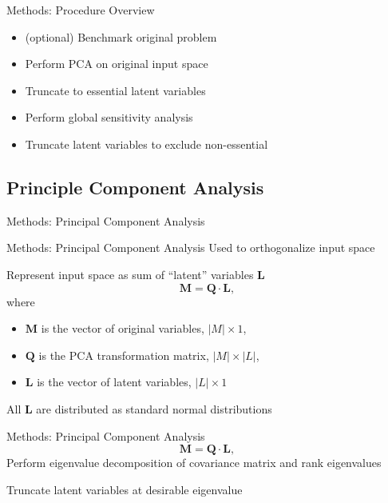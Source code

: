 \documentclass[t,9pt,svgnames]{beamer}
\begin{document}
\begin{frame}{Methods: Procedure Overview}
  \begin{itemize}
    \item (optional) Benchmark original problem
    \item Perform PCA on original input space
    \item Truncate to essential latent variables
    \item Perform global sensitivity analysis
    \item Truncate latent variables to exclude non-essential
  \end{itemize}
\end{frame}

\subsection{Principle Component Analysis}
\begin{frame}{Methods: Principal Component Analysis}
\end{frame}

\begin{frame}{Methods: Principal Component Analysis}
  Used to orthogonalize input space

  Represent input space as sum of ``latent'' variables $\bm{L}$
  \begin{equation}
    \bm{M} = \bm{Q} \cdot \bm{L},
  \end{equation}
  where
  \begin{itemize}
    \item $\bm{M}$ is the vector of original variables, $|M|\times1$,
    \item $\bm{Q}$ is the PCA transformation matrix, $|M|\times |L|$,
    \item $\bm{L}$ is the vector of latent variables, $|L|\times 1$
  \end{itemize}
  All $\bm{L}$ are distributed as standard normal distributions
\end{frame}

\begin{frame}{Methods: Principal Component Analysis}
  \begin{equation}
    \bm{M} = \bm{Q} \cdot \bm{L},
  \end{equation}
  Perform eigenvalue decomposition of covariance matrix and rank eigenvalues

  Truncate latent variables at desirable eigenvalue
\end{frame}
\end{document}
